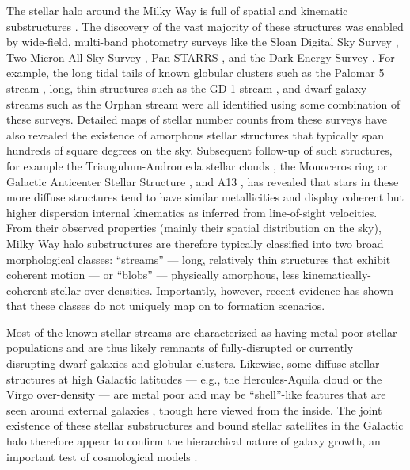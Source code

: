 \documentclass[twocolumn]{aastex62}
\begin{document}
The stellar halo around the Milky Way is full of spatial and kinematic
substructures \citep[e.g.,][]{Grillmair:2016}.
The discovery of the vast majority of these structures was enabled by
wide-field, multi-band photometry surveys like the Sloan Digital Sky Survey
\cite[SDSS;][]{York:2000, Gunn:2006, Eisenstein:2011}, Two Micron All-Sky Survey
\citep[2MASS;][]{Skrutskie:2006}, Pan-STARRS \citep[PS1;][]{Chambers:2016}, and
the Dark Energy Survey \citep[DES;][]{Dark-Energy-Survey-Collaboration:2016}.
For example, the long tidal tails of known globular clusters such as the Palomar
5 stream \citep{Odenkirchen:2001}, long, thin structures such as the GD-1 stream
\citep{Grillmair:2006}, and dwarf galaxy streams such as the Orphan stream
\citep{Grillmair:2006a} were all identified using some combination of these
surveys.
Detailed maps of stellar number counts from these surveys have also revealed the
existence of amorphous stellar structures that typically span hundreds of square
degrees on the sky.
Subsequent follow-up of such structures, for example the Triangulum-Andromeda
stellar clouds \citep[TriAnd;][]{Rocha-Pinto:2004, Martin:2007, Sheffield:2014},
the Monoceros ring or Galactic Anticenter Stellar Structure
\citep[Mon/GASS;][]{Newberg:2002, Yanny:2003, Crane:2003, Li:2012,
Morganson:2016}, and A13 \citep{Sharma:2010, Li:2017}, has revealed that stars
in these more diffuse structures tend to have similar metallicities and display
coherent but higher dispersion internal kinematics as inferred from
line-of-sight velocities.
From their observed properties (mainly their spatial distribution on the sky),
Milky Way halo substructures are therefore typically classified into two broad
morphological classes: ``streams'' --- long, relatively thin structures that
exhibit coherent motion --- or ``blobs'' --- physically amorphous, less
kinematically-coherent stellar over-densities.
Importantly, however, recent evidence has shown that these classes do not
uniquely map on to formation scenarios.

Most of the known stellar streams are characterized as having metal poor stellar
populations and are thus likely remnants of fully-disrupted or currently
disrupting dwarf galaxies and globular clusters.
Likewise, some diffuse stellar structures at high Galactic latitudes --- e.g.,
the Hercules-Aquila cloud \citep{Belokurov:2007, Simion:2014} or the Virgo
over-density \citep{Vivas:2001, Carlin:2012} --- are metal poor and may be
``shell''-like features that are seen around external galaxies
\citep[e.g.,][]{Kado-Fong:2018}, though here viewed from the inside.
The joint existence of these stellar substructures and bound stellar satellites
in the Galactic halo therefore appear to confirm the hierarchical nature of
galaxy growth, an important test of cosmological models \citep{Bullock:2005,
Johnston:2008}.
\end{document}
